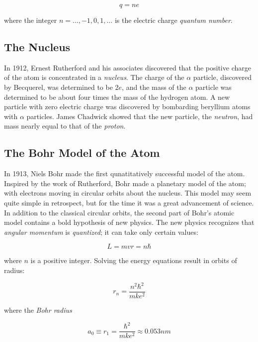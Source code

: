 \begin{equation*}
  q=n e
\end{equation*}

where the integer $n=\dots,-1,0,1,\dots$ is the electric charge
\emph{quantum number}.

\subsection*{The Nucleus}

In 1912, Ernest Rutherford and his associates discovered that the
positive charge of the atom is concentrated in a \emph{nucleus}. The
charge of the $\alpha$ particle, discovered by Becquerel, was
determined to be $2e$, and the mass of the $\alpha$ particle was
determined to be about four times the mass of the hydrogen
atom. \newline
A new particle with zero electric charge was discovered by bombarding
beryllium atoms with $\alpha$ particles. James Chadwick showed that
the new particle, the \emph{neutron}, had mass nearly equal to that of
the \emph{proton}.

\subsection*{The Bohr Model of the Atom}

In 1913, Niels Bohr made the first qunatitatively successful model of
the atom. Inspired by the work of Rutherford, Bohr made a planetary
model of the atom; with electrons moving in circular orbits about the
nucleus. This model may seem quite simple in retrospect, but for the
time it was a great advancement of science. In addition to the
classical circular orbits, the second part of Bohr's atomic model
contains a bold hypothesis of new physics. The new physics recognizes
that \emph{angular momentum} is \emph{quantized}; it can take only
certain values:

\begin{equation*}
  L = mvr = n \hbar
\end{equation*}

where $n$ is a positive integer. Solving the energy equations result
in orbits of radius:

\begin{equation*}
  r_n = \frac{n^2\hbar^2}{mke^2}
\end{equation*}

where the \emph{Bohr radius}

\begin{equation*}
  a_0 \equiv r_1 = \frac{\hbar^2}{mke^2} \approx 0.053 nm
\end{equation*}


